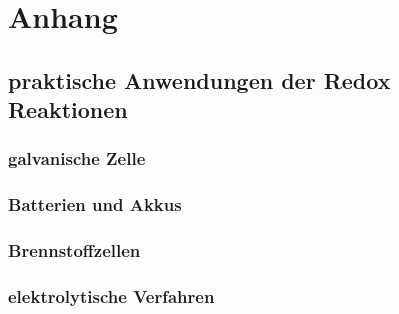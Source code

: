 \section{Anhang}

\subsection{praktische Anwendungen der Redox Reaktionen}
\subsubsection{galvanische Zelle}
\subsubsection{Batterien und Akkus}
\subsubsection{Brennstoffzellen}
\subsubsection{elektrolytische Verfahren}